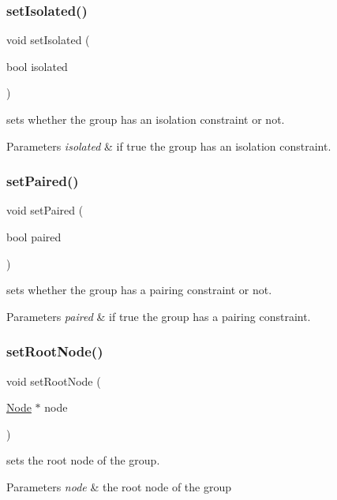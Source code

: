 \subsubsection{\texorpdfstring{set\+Isolated()}{setIsolated()}}
{\footnotesize\ttfamily void set\+Isolated (\begin{DoxyParamCaption}\item[{bool}]{isolated }\end{DoxyParamCaption})\hspace{0.3cm}{\ttfamily [inline]}}



sets whether the group has an isolation constraint or not. 


\begin{DoxyParams}{Parameters}
{\em isolated} & if true the group has an isolation constraint. \\
\hline
\end{DoxyParams}
\mbox{\label{class_open_chams_1_1_group_aff6de4e5c0da79ad8d0070c03bfd941b}} 
\subsubsection{\texorpdfstring{set\+Paired()}{setPaired()}}
{\footnotesize\ttfamily void set\+Paired (\begin{DoxyParamCaption}\item[{bool}]{paired }\end{DoxyParamCaption})\hspace{0.3cm}{\ttfamily [inline]}}



sets whether the group has a pairing constraint or not. 


\begin{DoxyParams}{Parameters}
{\em paired} & if true the group has a pairing constraint. \\
\hline
\end{DoxyParams}
\mbox{\label{class_open_chams_1_1_group_adc93b900e943312e905182fe44f21225}} 
\subsubsection{\texorpdfstring{set\+Root\+Node()}{setRootNode()}}
{\footnotesize\ttfamily void set\+Root\+Node (\begin{DoxyParamCaption}\item[{\mbox{\hyperlink{class_open_chams_1_1_node}{Node}} $\ast$}]{node }\end{DoxyParamCaption})\hspace{0.3cm}{\ttfamily [inline]}}



sets the root node of the group. 


\begin{DoxyParams}{Parameters}
{\em node} & the root node of the group \\
\hline
\end{DoxyParams}
